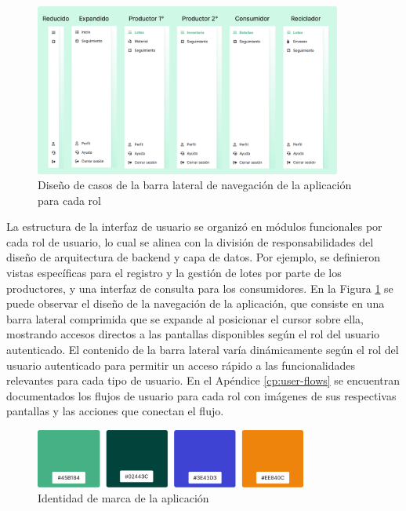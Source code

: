 \begin{figure}[!tb]
    \centering
    \includegraphics[width=0.9\textwidth]{Figures/frontend-navigation.png}
    \caption{Diseño de casos de la barra lateral de navegación de la aplicación para cada rol}
    \label{fig:frontend-navigation}
\end{figure}

La estructura de la interfaz de usuario se organizó en módulos funcionales por cada rol de usuario, lo cual se alinea con la división de responsabilidades del diseño de arquitectura de backend y capa de datos. Por ejemplo, se definieron vistas específicas para el registro y la gestión de lotes por parte de los productores, y una interfaz de consulta para los consumidores. En la Figura \ref{fig:frontend-navigation} se puede observar el diseño de la navegación de la aplicación, que consiste en una barra lateral comprimida que se expande al posicionar el cursor sobre ella, mostrando accesos directos a las pantallas disponibles según el rol del usuario autenticado. El contenido de la barra lateral varía dinámicamente según el rol del usuario autenticado para permitir un acceso rápido a las funcionalidades relevantes para cada tipo de usuario. En el Apéndice \ref{cp:user-flows} se encuentran documentados los flujos de usuario para cada rol con imágenes de sus respectivas pantallas y las acciones que conectan el flujo.

\begin{figure}[!htb]
    \centering
    \includegraphics[width=0.8\textwidth]{Figures/frontend-palette.png}
    \caption{Identidad de marca de la aplicación}
    \label{fig:frontend-brand}
\end{figure}


